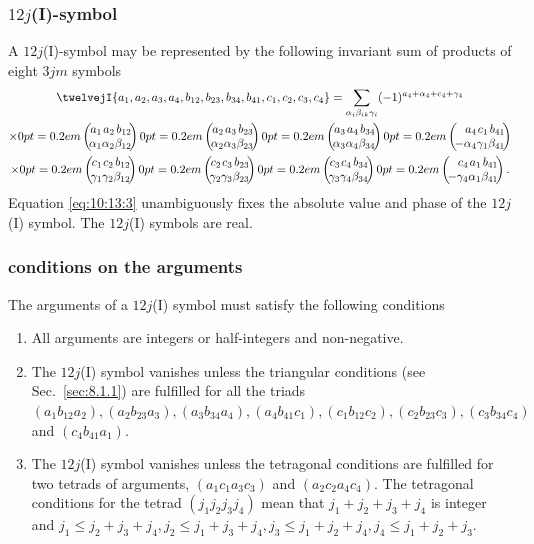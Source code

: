 \subsubsection{$12j$(I)-symbol}A $12j$(I)-symbol may be represented by the following invariant sum of products of eight $3 j m$ symbols
\begin{multline}
\twelvejI{a_{1},a_{2},a_{3},a_{4},b_{12},b_{23},b_{34},b_{41},c_{1},c_{2},c_{3},c_{4}}=\sum_{\alpha_{i} \beta_{i k} \gamma_{i}}(-1)^{a_{4}+\alpha_{4}+c_{4}+\gamma_{4}}  \\
\times\threej{a_{1} }{ a_{2} }{ b_{12} }{\alpha_{1} }{ \alpha_{2} }{ \beta_{12}}\threej{a_{2} }{ a_{3} }{ b_{23} }{\alpha_{2} }{ \alpha_{3} }{ \beta_{23}}\threej{a_{3} }{ a_{4} }{ b_{34} }{\alpha_{3} }{ \alpha_{4} }{ \beta_{34}}\threej{a_{4} }{ c_{1} }{ b_{41} }{-\alpha_{4} }{ \gamma_{1} }{ \beta_{41}}  \\
\times\threej{c_{1} }{ c_{2} }{ b_{12} }{\gamma_{1} }{ \gamma_{2} }{ \beta_{12}}\threej{c_{2} }{ c_{3} }{ b_{23} }{\gamma_{2} }{ \gamma_{3} }{ \beta_{23}}\threej{c_{3} }{ c_{4} }{ b_{34} }{\gamma_{3} }{ \gamma_{4} }{ \beta_{34}}\threej{c_{4} }{ a_{1} }{ b_{41} }{-\gamma_{4} }{ \alpha_{1} }{ \beta_{41}} . \label{eq:10:13:3}
\end{multline}
Equation \eqref{eq:10:13:3} unambiguously fixes the absolute value and phase of the $12j$(I) symbol. The $12j$(I) symbols are real.\\
\subsubsection{conditions on the arguments}
 The arguments of a $12j$(I) symbol must satisfy the following conditions
\begin{enumerate}[label=(\roman*)]
\item All arguments are integers or half-integers and non-negative.
\item The $12j$(I) symbol vanishes unless the triangular conditions (see Sec.~\ref{sec:8.1.1}) are fulfilled for all the triads $\left(a_{1} b_{12} a_{2}\right),\left(a_{2} b_{23} a_{3}\right),\left(a_{3} b_{34} a_{4}\right),\left(a_{4} b_{41} c_{1}\right),\left(c_{1} b_{12} c_{2}\right),\left(c_{2} b_{23} c_{3}\right),\left(c_{3} b_{34} c_{4}\right)$ and $\left(c_{4} b_{41} a_{1}\right)$.
\item  The $12j$(I) symbol vanishes unless the tetragonal conditions are fulfilled for two tetrads of arguments, $\left(a_{1} c_{1} a_{3} c_{3}\right)$ and $\left(a_{2} c_{2} a_{4} c_{4}\right)$. The tetragonal conditions for the tetrad $\left(j_{1} j_{2} j_{3} j_{4}\right)$ mean that $j_{1}+j_{2}+j_{3}+j_{4}$ is integer and $j_{1} \leq j_{2}+j_{3}+j_{4}, j_{2} \leq j_{1}+j_{3}+j_{4}, j_{3} \leq j_{1}+j_{2}+j_{4}, j_{4} \leq j_{1}+j_{2}+j_{3}$.
\end{enumerate}

